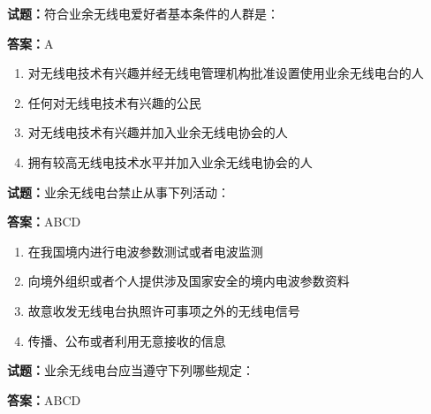 \documentclass{ctexbook}
\begin{document}




\vspace{1em}

\textbf{试题：}符合业余无线电爱好者基本条件的人群是： 

\textbf{答案：}A 

\begin{enumerate}[leftmargin=3em]
  \item 对无线电技术有兴趣并经无线电管理机构批准设置使用业余无线电台的人 

  \item 任何对无线电技术有兴趣的公民 


  \item 对无线电技术有兴趣并加入业余无线电协会的人 

  \item 拥有较高无线电技术水平并加入业余无线电协会的人 

\end{enumerate}





\vspace{1em}

\textbf{试题：}业余无线电台禁止从事下列活动： 

\textbf{答案：}ABCD 

\begin{enumerate}[leftmargin=3em]
  \item 在我国境内进行电波参数测试或者电波监测 

  \item 向境外组织或者个人提供涉及国家安全的境内电波参数资料 

  \item 故意收发无线电台执照许可事项之外的无线电信号 

  \item 传播、公布或者利用无意接收的信息 

\end{enumerate}





\vspace{1em}

\textbf{试题：}业余无线电台应当遵守下列哪些规定： 

\textbf{答案：}ABCD 
\end{document}
